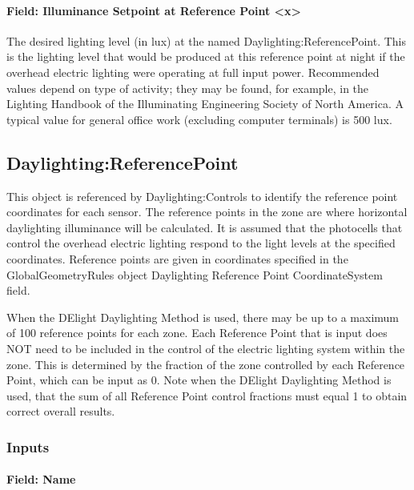 \paragraph{Field: Illuminance Setpoint at Reference Point <x>}\label{field-illuminance-setpoint-at-reference-point-x}

The desired lighting level (in lux) at the named Daylighting:ReferencePoint. This is the lighting level that would be produced at this reference point at night if the overhead electric lighting were operating at full input power. Recommended values depend on type of activity; they may be found, for example, in the Lighting Handbook of the Illuminating Engineering Society of North America. A typical value for general office work (excluding computer terminals) is 500 lux.

\subsection{Daylighting:ReferencePoint}\label{daylightingreferencepoint-000}

This object is referenced by Daylighting:Controls to identify the reference point coordinates for each sensor. The reference points in the zone are where horizontal daylighting illuminance will be calculated. It is assumed that the photocells that control the overhead electric lighting respond to the light levels at the specified coordinates. Reference points are given in coordinates specified in the GlobalGeometryRules object Daylighting Reference Point CoordinateSystem field.

When the DElight Daylighting Method is used, there may be up to a maximum of 100 reference points for each zone. Each Reference Point that is input does NOT need to be included in the control of the electric lighting system within the zone. This is determined by the fraction of the zone controlled by each Reference Point, which can be input as 0. Note when the DElight Daylighting Method is used, that the sum of all Reference Point control fractions must equal 1 to obtain correct overall results.

\subsubsection{Inputs}\label{inputs-010}

\paragraph{Field: Name}\label{field-name-002}

